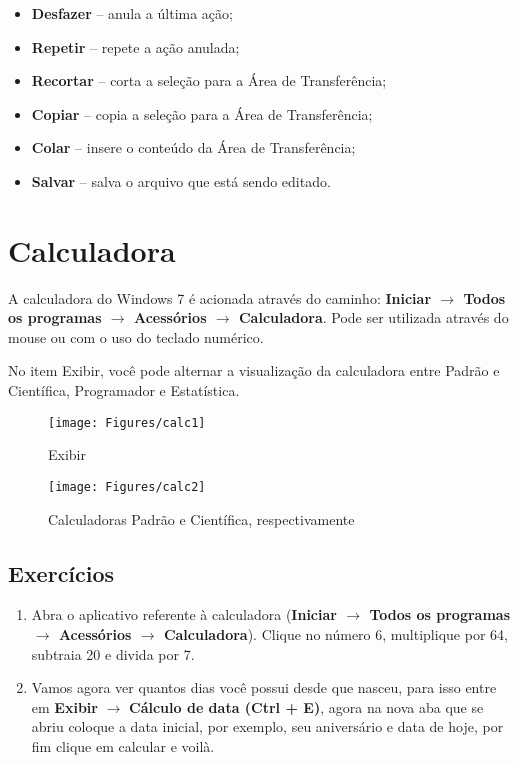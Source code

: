 \documentclass[hidelinks,12pt]{article}
\begin{document}
			\begin{itemize}
				\item {\bf Desfazer} – anula a última ação;

				\item {\bf Repetir} – repete a ação anulada;

				\item {\bf Recortar} – corta a seleção para a Área de Transferência;

				\item {\bf Copiar} – copia a seleção para a Área de Transferência;

				\item {\bf Colar} – insere o conteúdo da Área de Transferência;

				\item {\bf Salvar} – salva o arquivo que está sendo editado.
			\end{itemize}

			\section{Calculadora}

			A calculadora do Windows 7 é acionada através do caminho: {\bf Iniciar $\rightarrow$ Todos os programas $\rightarrow$ Acessórios $\rightarrow$ Calculadora}. Pode ser utilizada através do mouse ou com o uso do teclado numérico.

			No item Exibir, você pode alternar a visualização da calculadora entre Padrão e Científica, Programador e Estatística.

			\begin{figure}[!h]
				\centering
				\texttt{[image: Figures/calc1]}
				\label{fig:calc1}
				\caption{Exibir}
			\end{figure}

			\begin{figure}[!h]
				\centering
				\texttt{[image: Figures/calc2]}
				\label{fig:calc2}
				\caption{Calculadoras Padrão e Científica, respectivamente}
			\end{figure}

		\subsection{Exercícios}

		\begin{enumerate}
			\item Abra o aplicativo referente à calculadora ({\bf Iniciar $\rightarrow$ Todos os programas $\rightarrow$ Acessórios $\rightarrow$ Calculadora}). Clique no número 6, multiplique por 64, subtraia 20 e divida por 7.

			\item Vamos agora ver quantos dias você possui desde que nasceu, para isso entre em \textbf{Exibir} $\rightarrow$ \textbf{Cálculo de data (Ctrl + E)}, agora na nova aba que se abriu coloque a data inicial, por exemplo, seu aniversário e data de hoje, por fim clique em calcular e voilà.
		\end{enumerate}
\end{document}
